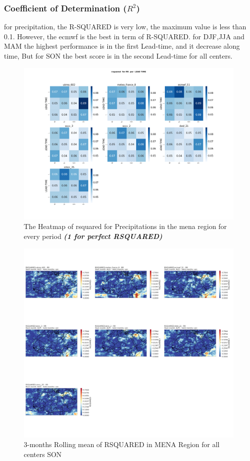 \subsubsection{Coefficient of Determination (\( R^2 \))}
for precipitation, the R-SQUARED is very low, the maximum value is less than 0.1. However, the ecmwf is the best in term of R-SQUARED. for DJF,JJA and MAM the highest performance is in the first Lead-time, and it decrease along time, But for SON the best score is in the second Lead-time for all centers.
\begin{figure}[H]
	\centering
	\includegraphics[scale=0.25]{plots/det/rsquared/rsquared_RR_mena.png}
	\caption{The Heatmap of rsquared for Precipitations in the mena region for every period \textbf{\textit{(1 for perfect RSQUARED)} }}
\end{figure}


\begin{figure}[H]
\includegraphics[scale=0.3]{plots/det/rsquared/rsquared_son_RR.png}
\caption{3-months Rolling mean of RSQUARED in MENA Region for all centers SON}
\end{figure}

